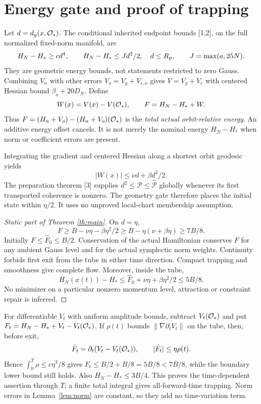 \documentclass[11pt,a4paper]{article}
\begin{document}
\section{Energy gate and proof of trapping}
Let $d=d_g(x,\mathcal O_*)$. The conditional inherited endpoint bounds [1,2], on the full normalized fixed-norm manifold, are
\[
H_N-H_*\ge c d^4,\qquad H_N-H_*\le Jd^2/2,
\quad d\le R_{\rm p},\qquad J=\max(a,25N).
\]
They are geometric energy bounds, not statements restricted to zero Gauss. Combining $V_n$ with other errors $V_o=V_g+V_{c,o}$ gives $V=V_g+V_c$ with centered Hessian bound $\beta_o+20D_N$. Define
\[
W(x)=V(x)-V(\mathcal O_*),\qquad F=H_N-H_*+W.
\]
Thus $F=(H_n+V_o)-(H_n+V_o)(\mathcal O_*)$ is the \emph{total actual orbit-relative energy}. An additive energy offset cancels. It is not merely the nominal energy $H_N-H_*$ when norm or coefficient errors are present.

Integrating the gradient and centered Hessian along a shortest orbit geodesic yields
\[
|W(x)|\le\nu d+\beta d^2/2.
\]
The preparation theorem [3] supplies $d^2\le\mathcal P\le\widehat{\mathcal P}$ globally whenever its first transported coherence is nonzero. The geometry gate therefore places the initial state within $\eta/2$. It uses no unproved local-chart membership assumption.
\begin{proof}[Static part of Theorem \ref{th:main}]
On $d=\eta$,
\[
F\ge B-\nu\eta-\beta\eta^2/2\ge B-\eta(\nu+\beta\eta)\ge7B/8.
\]
Initially $F\le\widehat F_0\le B/2$. Conservation of the actual Hamiltonian conserves $F$ for any ambient Gauss level and for the actual symplectic norm weights. Continuity forbids first exit from the tube in either time direction. Compact trapping and smoothness give complete flow. Moreover, inside the tube,
\[
H_N(x(t))-H_*\le\widehat F_0+\nu\eta+\beta\eta^2/2\le5B/8.
\]
No minimizer on a particular nonzero momentum level, attraction or constraint repair is inferred.
\end{proof}
For differentiable $V_t$ with uniform amplitude bounds, subtract $V_t(\mathcal O_*)$ and put $F_t=H_N-H_*+V_t-V_t(\mathcal O_*)$. If $\rho(t)$ bounds $\|\nabla\partial_tV_t\|$ on the tube, then, before exit,
\[
\dot F_t=\partial_t(V_t-V_t(\mathcal O_*)),\qquad |\dot F_t|\le\eta\rho(t).
\]
Hence $\int_0^T\rho\le c\eta^3/8$ gives $F_t\le B/2+B/8=5B/8<7B/8$, while the boundary lower bound still holds. Also $H_N-H_*\le3B/4$. This proves the time-dependent assertion through $T$; a finite total integral gives all-forward-time trapping. Norm errors in Lemma~\ref{lem:norm} are constant, so they add no time-variation term.
\newpage
\end{document}
